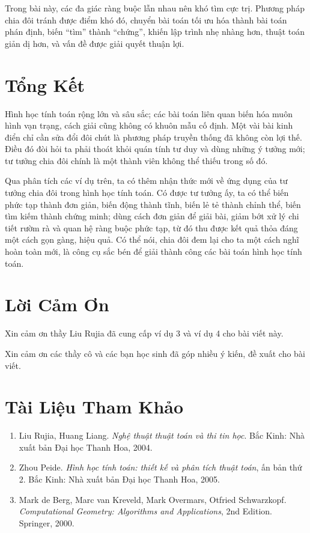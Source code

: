 \documentclass[11pt]{article}
\begin{document}
Trong bài này, các đa giác ràng buộc lẫn nhau nên khó tìm cực trị. Phương
pháp chia đôi tránh được điểm khó đó, chuyển bài toán tối ưu hóa thành bài
toán phán định, biến ``tìm'' thành ``chứng'', khiến lập trình nhẹ nhàng hơn,
thuật toán giản dị hơn, và vấn đề được giải quyết thuận lợi.

\section{Tổng Kết}

Hình học tính toán rộng lớn và sâu sắc; các bài toán liên quan biến hóa muôn
hình vạn trạng, cách giải cũng không có khuôn mẫu cố định. Một vài bài kinh
điển chỉ cần sửa đổi đôi chút là phương pháp truyền thống đã không còn lợi
thế. Điều đó đòi hỏi ta phải thoát khỏi quán tính tư duy và dùng những ý
tưởng mới; tư tưởng chia đôi chính là một thành viên không thể thiếu trong số
đó.

Qua phân tích các ví dụ trên, ta có thêm nhận thức mới về ứng dụng của tư
tưởng chia đôi trong hình học tính toán. Có được tư tưởng ấy, ta có thể biến
phức tạp thành đơn giản, biến động thành tĩnh, biến lẻ tẻ thành chỉnh thể,
biến tìm kiếm thành chứng minh; dùng cách đơn giản để giải bài, giảm bớt xử
lý chi tiết rườm rà và quan hệ ràng buộc phức tạp, từ đó thu được kết quả
thỏa đáng một cách gọn gàng, hiệu quả. Có thể nói, chia đôi đem lại cho ta
một cách nghĩ hoàn toàn mới, là công cụ sắc bén để giải thành công các bài
toán hình học tính toán.

\section*{Lời Cảm Ơn}

Xin cảm ơn thầy Liu Rujia đã cung cấp ví dụ 3 và ví dụ 4 cho bài viết này.

Xin cảm ơn các thầy cô và các bạn học sinh đã góp nhiều ý kiến, đề xuất cho
bài viết.

\section*{Tài Liệu Tham Khảo}

\begin{enumerate}
  \item Liu Rujia, Huang Liang. \textit{Nghệ thuật thuật toán và thi tin học}.
  Bắc Kinh: Nhà xuất bản Đại học Thanh Hoa, 2004.
  \item Zhou Peide. \textit{Hình học tính toán: thiết kế và phân tích thuật
  toán}, ấn bản thứ 2. Bắc Kinh: Nhà xuất bản Đại học Thanh Hoa, 2005.
  \item Mark de Berg, Marc van Kreveld, Mark Overmars, Otfried Schwarzkopf.
  \textit{Computational Geometry: Algorithms and Applications}, 2nd Edition.
  Springer, 2000.
\end{enumerate}
\end{document}
